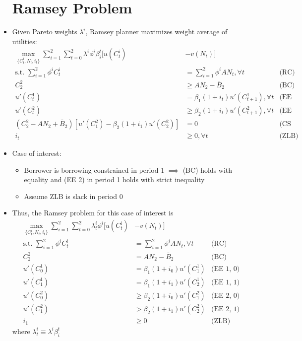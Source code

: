 \documentclass{article}
\begin{document}
\begin{itemize}
\section{Ramsey Problem}
\item Given Pareto weights $\lambda^i$, Ramsey planner maximizes weight average of utilities:
\begin{align*}
\max_{\{C_t^i, N_t, i_t\}} \sum_{i=1}^2 \sum_{t=0}^2 \lambda^i \phi^i \beta^t_i [u(C_t^i) &- v(N_t)]\\
\text{s.t. }
\sum_{i=1}^2 \phi^i C_t^i &= \sum_{i=1}^2 \phi^i A N_t, \forall t & \text{(RC)} \\
C_2^2 &\ge  AN_2 - \bar B_2 & \text{(BC)}\\
u'(C_t^1) &= \beta_1 (1+i_t) u'(C_{t+1}^1), \forall t & \text{(EE 1)}\\
u'(C_t^2) &\ge \beta_2 (1+i_t) u'(C_{t+1}^2), \forall t & \text{(EE 2)}\\
(C_2^2 - A N_2 + \bar B_2)[u'(C_1^2) - \beta_2 (1 +i_1)u'(C_2^2) ] &= 0 & \text{(CS 2)}\\
i_t &\ge 0, \forall t & \text{(ZLB)}
\end{align*}
\item Case of interest:
\begin{itemize}
\item Borrower is borrowing constrained in period 1 $\implies$ (BC) holds with equality and (EE 2) in period 1 holds with strict inequality
\item Assume ZLB is slack in period 0
\end{itemize}
\item Thus, the Ramsey problem for this case of interest is
\begin{align*}
\max_{\{C_t^i, N_t, i_t\}} \sum_{i=1}^2 \sum_{t=0}^2 \lambda^i_t \phi^i [u(C_t^i) &- v(N_t)]\\
\text{s.t. }
\sum_{i=1}^2 \phi^i C_t^i &= \sum_{i=1}^2 \phi^i A N_t, \forall t & \text{(RC)} \\
C_2^2 &=  A N_2 - \bar B_2 & \text{(BC)}\\
u'(C_0^1) &= \beta_1 (1+i_0) u'(C_{1}^1) & \text{(EE 1, 0)}\\
u'(C_1^1) &= \beta_1 (1+i_1) u'(C_{2}^1) & \text{(EE 1, 1)}\\
u'(C_0^2) &\ge \beta_2 (1+i_0) u'(C_{1}^2) & \text{(EE 2, 0)}\\
u'(C_1^2) &> \beta_2 (1+i_1) u'(C_{2}^2) & \text{(EE 2, 1)}\\
i_1 &\ge 0 & \text{(ZLB)}
\end{align*}
where $\lambda_t^i \equiv \lambda^i \beta_i^t$

\end{itemize}
\end{document}
